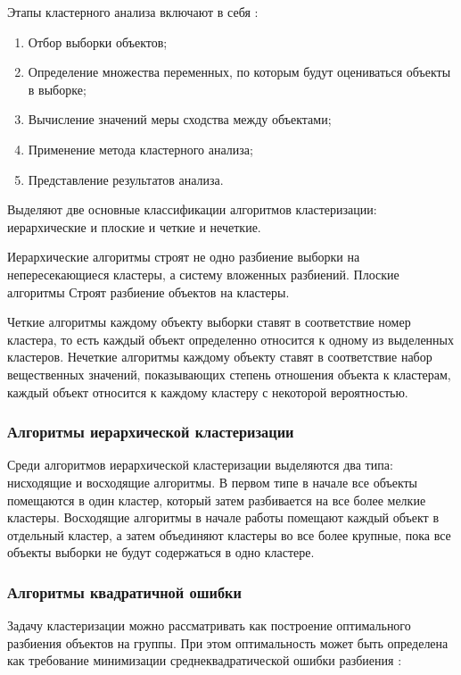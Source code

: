 Этапы кластерного анализа включают в себя \cite{clasters}:

\begin{enumerate}[leftmargin=1.6\parindent]
\item Отбор выборки объектов;
\item Определение множества переменных, по которым будут оцениваться объекты в выборке;
\item Вычисление значений меры сходства между объектами;
\item Применение метода кластерного анализа;
\item Представление результатов анализа.
\end{enumerate}

Выделяют две основные классификации алгоритмов кластеризации: иерархические и плоские и четкие и нечеткие. \cite{clasters}

Иерархические алгоритмы строят не одно разбиение выборки на непересекающиеся кластеры, а систему вложенных разбиений. Плоские алгоритмы Строят разбиение объектов на кластеры. \cite{clasters}

Четкие алгоритмы каждому объекту выборки ставят в соответствие номер кластера, то есть каждый объект определенно относится к одному из выделенных кластеров. Нечеткие алгоритмы каждому объекту ставят в соответствие набор вещественных значений, показывающих степень отношения объекта к кластерам, каждый объект относится к каждому кластеру с некоторой вероятностью. \cite{clasters}

\subsubsection{Алгоритмы иерархической кластеризации}

Среди алгоритмов иерархической кластеризации выделяются два типа: нисходящие и восходящие алгоритмы. В первом типе в начале все объекты помещаются в один кластер, который затем разбивается на все более мелкие кластеры. Восходящие алгоритмы в начале работы помещают каждый объект в отдельный кластер, а затем объединяют кластеры во все более крупные, пока все объекты выборки не будут содержаться в одно кластере. \cite{clasters}

\subsubsection{Алгоритмы квадратичной ошибки}
Задачу кластеризации можно рассматривать как построение оптимального разбиения объектов на группы. При этом оптимальность может быть определена как требование минимизации среднеквадратической ошибки разбиения \cite{clasters}:

